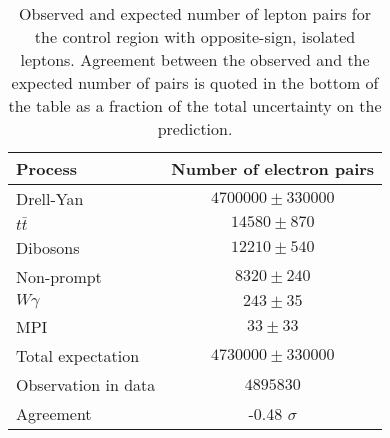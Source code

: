 \begin{table}[htbp]
\begin{center}
\begin{tabular}{l|c}

Process & Number of electron pairs \\\hline\hline
        Drell-Yan	& $ 4700000 \pm 330000 $	\\[+0.05in]
	$t\bar{t}$	& $ 14580 \pm 870 $	\\[+0.05in]
	Dibosons	& $ 12210 \pm 540 $	\\[+0.05in]
	Non-prompt	& $ 8320 \pm 240 $	\\[+0.05in]
	$W\gamma$	& $ 243 \pm 35 $	\\[+0.05in]
	MPI	& $ 33 \pm 33 $	\\[+0.05in]
	\hline
	Total expectation	& $ 4730000 \pm 330000 $	\\[+0.05in]
	\hline
	Observation in data	& $ 4895830 $	\\[+0.05in]
	\hline
	Agreement & -0.48 $\sigma$ \\[+0.05in]
\hline  
\end{tabular}
\end{center}
\caption{Observed and expected number of lepton pairs for the control region with opposite-sign, isolated leptons.
Agreement between the observed and the expected number of pairs is quoted in the bottom of the table as a fraction of the total uncertainty on the prediction.
} %
\label{tab:dilep_isoOS}
\end{table}

